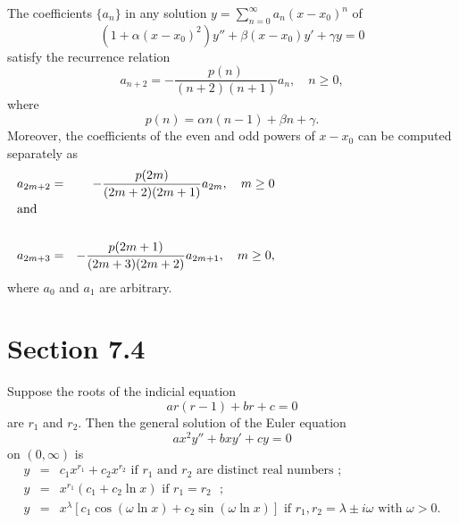 \setcounter{theorem}{1}
\setcounter{equation}{22}
\begin{theorem}
  \label{thmtype:7.2.2} The coefficients $\{a_{n}\}$ in any solution
  $y=\sum_{n=0}^{\infty}a_{n}(x-x_{0})^{n}$ of
  \begin{equation}
    \label{eq:7.2.23}\left(1+\alpha(x-x_{0})^{2}\right)y''+\beta(x-x_{0})y'+\gamma y=0
  \end{equation}
  satisfy the recurrence relation
  \begin{equation}
    \label{eq:7.2.24}a_{n+2}=-\frac{p(n)}{(n+2)(n+1)}a_{n},\quad n\ge0,
  \end{equation}
  where
  \begin{equation}
    \label{eq:7.2.25}p(n)=\alpha n(n-1)+\beta n+\gamma.
  \end{equation}
  Moreover, the coefficients of the even and odd powers of $x-x_{0}$ can be computed separately as
  \begin{eqnarray}
    a_{2m+2}                                     & = & -\frac{p(2m)}{(2m+2)(2m+1)}a_{2m},\quad m\ge0\label{eq:7.2.26} \\
    \noalign{\hspace*{-15pt}\mbox{and}}\nonumber                                                                      \\
    a_{2m+3}                                     & = & -\frac{p(2m+1)}{(2m+3)(2m+2)}a_{2m+1},\quad m\ge0,\label{eq:7.2.27}
  \end{eqnarray}
  where $a_{0}$ and $a_{1}$ are arbitrary.
\end{theorem}

\section*{Section 7.4}
\setcounter{chapter}{7}
\setcounter{section}{4}

\setcounter{theorem}{2}
\setcounter{equation}{10}
\begin{theorem}
  \label{thmtype:7.4.3} Suppose the roots of the indicial equation
  \begin{equation}
    \label{eq:7.4.11}ar(r-1)+br+c=0
  \end{equation}
  are $r_{1}$ and $r_{2}$. Then the general solution of the Euler equation
  \begin{equation}
    \label{eq:7.4.12}ax^{2}y''+bxy'+cy=0
  \end{equation}
  on $(0,\infty)$ is
  \begin{eqnarray*}
    y & = & c_{1}x^{r_{1}}+c_{2}x^{r_{2}}\mbox{ if $r_{1}$ and $r_{2}$ are distinct real numbers }; \\
    y & = & x^{r_{1}}(c_{1}+c_{2}\ln x)\mbox{ if $r_{1}=r_{2}$ };                                   \\
    y & = & x^{\lambda}\left[c_{1}\cos\left(\omega\ln x\right)+c_{2}\sin\left(\omega\ln x\right)\right]\mbox{ if $r_{1},r_{2}=\lambda\pm i\omega$ with $\omega>0$}.
  \end{eqnarray*}
\end{theorem}

